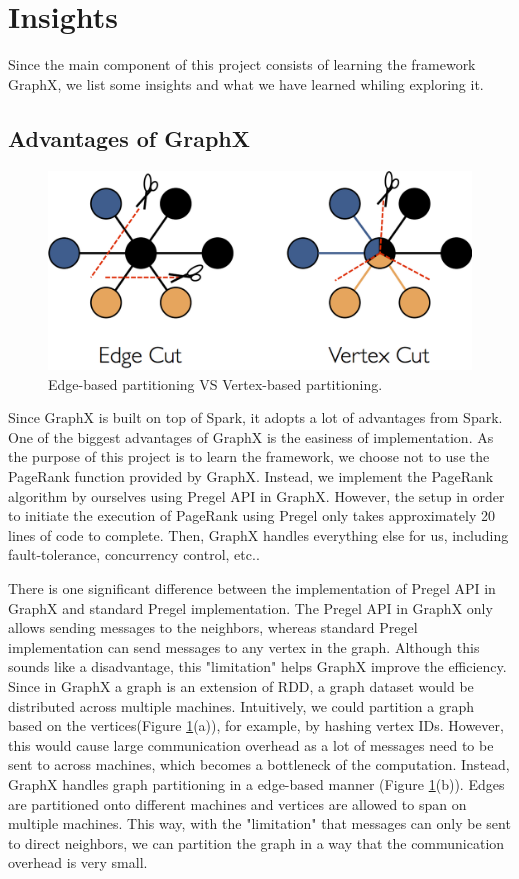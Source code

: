\section{Insights} \label{sec:insights}
%
Since the main component of this project consists of learning the framework GraphX, we list some insights and what we have learned whiling exploring it.
%
\subsection{Advantages of GraphX}
%
\begin{figure}[t]
	\centering
	\includegraphics[width=0.7\linewidth]{edge_cut_vs_vertex_cut.png}
	\caption{Edge-based partitioning VS Vertex-based partitioning.}
	\label{fig:edgecut}
\end{figure}

Since GraphX is built on top of Spark, it adopts a lot of advantages from Spark.
%
One of the biggest advantages of GraphX is the easiness of implementation.
%
As the purpose of this project is to learn the framework, we choose not to use the PageRank function provided by GraphX.
%
Instead, we implement the PageRank algorithm by ourselves using Pregel API in GraphX.
%
However, the setup in order to initiate the execution of PageRank using Pregel only takes approximately 20 lines of code to complete.
%
Then, GraphX handles everything else for us, including fault-tolerance, concurrency control, etc..
%

There is one significant difference between the implementation of Pregel API in GraphX and standard Pregel implementation.
%
The Pregel API in GraphX only allows sending messages to the neighbors, whereas standard Pregel implementation can send messages to any vertex in the graph.
%
Although this sounds like a disadvantage, this "limitation" helps GraphX improve the efficiency.
%
Since in GraphX a graph is an extension of RDD, a graph dataset would be distributed across multiple machines.
%
Intuitively, we could partition a graph based on the vertices(Figure \ref{fig:edgecut}(a))\cite{Gonzalez:2014:GGP:2685048.2685096}, for example, by hashing vertex IDs. 
%
However, this would cause large communication overhead as a lot of messages need to be sent to across machines, which becomes a bottleneck of the computation.
%
Instead, GraphX handles graph partitioning in a edge-based manner (Figure \ref{fig:edgecut}(b)).
%
Edges are partitioned onto different machines and vertices are allowed to span on multiple machines.
%
This way, with the "limitation" that messages can only be sent to direct neighbors, we can partition the graph in a way that the communication overhead is very small.
%

